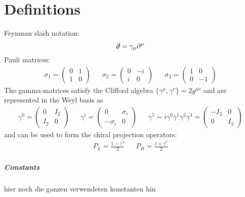 \chapter{Definitions}
Feynman slash notation:
\begin{equation*}
\slashed{\partial}=\gamma_\mu\partial^\mu
\end{equation*}
Pauli matrices:
\begin{align*}
\sigma_1=\begin{pmatrix}
0&1\\1&0
\end{pmatrix}&&
\sigma_2=\begin{pmatrix}
0&-i\\i&0
\end{pmatrix}&&
\sigma_3=\begin{pmatrix}
1&0\\0&-1
\end{pmatrix}
\end{align*}
The gamma-matrices satisfy the Clifford algebra $\{\gamma^\mu,\gamma^\nu\}=2g^{\mu\nu}$
and are represented in the Weyl basis as
\begin{align*}
\gamma^0=\begin{pmatrix}
0&I_2\\I_2&0
\end{pmatrix}&&
\gamma^i=\begin{pmatrix}
0&\sigma_i\\-\sigma_i&0
\end{pmatrix}
&&
\gamma^5=i\gamma^0\gamma^1\gamma^2\gamma^3=\begin{pmatrix}
-I_2&0\\0&I_2
\end{pmatrix}
\end{align*}
and can be used to form the chiral projection operators:
\begin{align*}
P_L=\frac{1-\gamma^5}{2}&&P_R=\frac{1+\gamma^5}{2}
\end{align*}
\paragraph{Constants}
hier noch die ganzen verwendeten konstanten hin